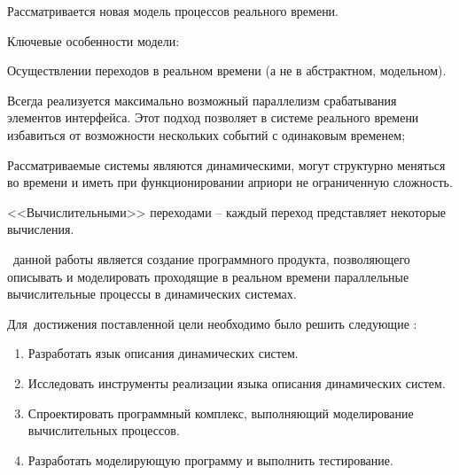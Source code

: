 
{\actuality} Рассматривается новая модель процессов реального времени.  

Ключевые особенности модели: 

Осуществлении переходов в реальном времени (а не в абстрактном, модельном). 

Всегда реализуется максимально возможный параллелизм срабатывания элементов интерфейса. Этот подход позволяет в системе реального времени избавиться от возможности нескольких событий с одинаковым временем; 

Рассматриваемые системы являются динамическими, могут структурно меняться во времени и иметь при функционировании априори не ограниченную сложность. 

<<Вычислительными>> переходами – каждый переход представляет некоторые вычисления.



 \aim\ данной работы является создание программного продукта, позволяющего описывать и моделировать проходящие в реальном времени параллельные вычислительные процессы в динамических системах. 

Для~достижения поставленной цели необходимо было решить следующие {\tasks}:
\begin{enumerate}
  \item Разработать язык описания динамических систем.
  \item Исследовать инструменты реализации языка описания динамических систем.
  \item Спроектировать программный комплекс, выполняющий моделирование вычислительных процессов.
  \item Разработать моделирующую программу и выполнить тестирование.
\end{enumerate}


